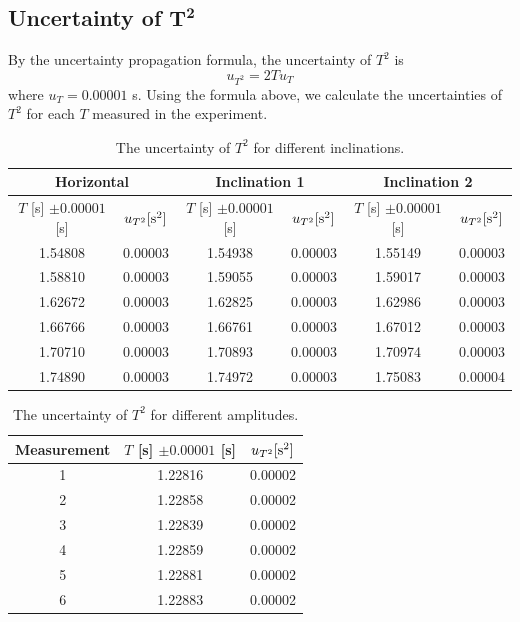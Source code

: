 \documentclass[a4paper]{report}
\begin{document}
	\subsection{Uncertainty of $\bm{T^2}$}
	By the uncertainty propagation formula, the uncertainty of $T^2$ is
	\begin{equation*}
	u_{T^2}=2Tu_T
	\end{equation*}
	where $u_T=0.00001$ s. Using the formula above, we calculate the uncertainties of $T^2$ for each $T$ measured in the experiment.
	\begin{table}[H]
		\centering
		\begin{tabular}{|c|c|c|c|c|c|}
			\hline
			\multicolumn{2}{|c|}{Horizontal}&\multicolumn{2}{|c|}{Inclination 1}&\multicolumn{2}{|c|}{Inclination 2}\\
			\hline
			$T$ [s] $\pm0.00001$ [s]&$u_{T^2} [\rm{s^2}]$&$T$ [s] $\pm0.00001$ [s]&$u_{T^2} [\rm{s^2}]$&$T$ [s] $\pm0.00001$ [s]&$u_{T^2} [\rm{s^2}]$\\
			\hline
			1.54808&0.00003&1.54938&0.00003&1.55149&0.00003\\
			\hline
			1.58810&0.00003&1.59055&0.00003&1.59017&0.00003\\
			\hline
			1.62672&0.00003&1.62825&0.00003&1.62986&0.00003\\
			\hline
			1.66766&0.00003&1.66761&0.00003&1.67012&0.00003\\
			\hline
			1.70710&0.00003&1.70893&0.00003&1.70974&0.00003\\
			\hline
			1.74890&0.00003&1.74972&0.00003&1.75083&0.00004\\
			\hline
		\end{tabular}
	\caption{The uncertainty of $T^2$ for different inclinations.}
	\end{table}
	\begin{table}[H]
		\centering
		\begin{tabular}{|c|c|c|}
			\hline
			Measurement&$T$ [s] $\pm0.00001$ [s]&$u_{T^2} [\rm{s^2}]$\\
			\hline
			1&1.22816&0.00002\\
			\hline
			2&1.22858&0.00002\\
			\hline
			3&1.22839&0.00002\\
			\hline
			4&1.22859&0.00002\\
			\hline
			5&1.22881&0.00002\\
			\hline
			6&1.22883&0.00002\\
			\hline
		\end{tabular}
	\caption{The uncertainty of $T^2$ for different amplitudes.}
	\end{table}
\end{document}
